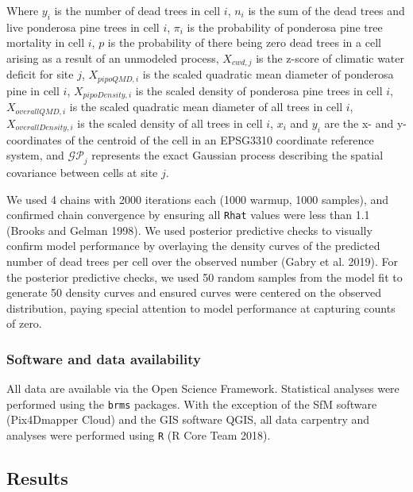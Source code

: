 \documentclass[]{article}
\begin{document}
Where \(y_i\) is the number of dead trees in cell \(i\), \(n_i\) is the
sum of the dead trees and live ponderosa pine trees in cell \(i\),
\(\pi_i\) is the probability of ponderosa pine tree mortality in cell
\(i\), \(p\) is the probability of there being zero dead trees in a cell
arising as a result of an unmodeled process, \(X_{cwd, j}\) is the
z-score of climatic water deficit for site \(j\), \(X_{pipoQMD, i}\) is
the scaled quadratic mean diameter of ponderosa pine in cell \(i\),
\(X_{pipoDensity, i}\) is the scaled density of ponderosa pine trees in
cell \(i\), \(X_{overallQMD, i}\) is the scaled quadratic mean diameter
of all trees in cell \(i\), \(X_{overallDensity, i}\) is the scaled
density of all trees in cell \(i\), \(x_i\) and \(y_i\) are the x- and
y- coordinates of the centroid of the cell in an EPSG3310 coordinate
reference system, and \(\mathcal{GP}_j\) represents the exact Gaussian
process describing the spatial covariance between cells at site \(j\).

We used 4 chains with 2000 iterations each (1000 warmup, 1000 samples),
and confirmed chain convergence by ensuring all \texttt{Rhat} values
were less than 1.1 (Brooks and Gelman 1998). We used posterior
predictive checks to visually confirm model performance by overlaying
the density curves of the predicted number of dead trees per cell over
the observed number (Gabry et al. 2019). For the posterior predictive
checks, we used 50 random samples from the model fit to generate 50
density curves and ensured curves were centered on the observed
distribution, paying special attention to model performance at capturing
counts of zero.

\subsubsection{Software and data
availability}\label{software-and-data-availability}

All data are available via the Open Science Framework. Statistical
analyses were performed using the \texttt{brms} packages. With the
exception of the SfM software (Pix4Dmapper Cloud) and the GIS software
QGIS, all data carpentry and analyses were performed using \texttt{R} (R
Core Team 2018).

\subsection{Results}\label{results}
\end{document}
